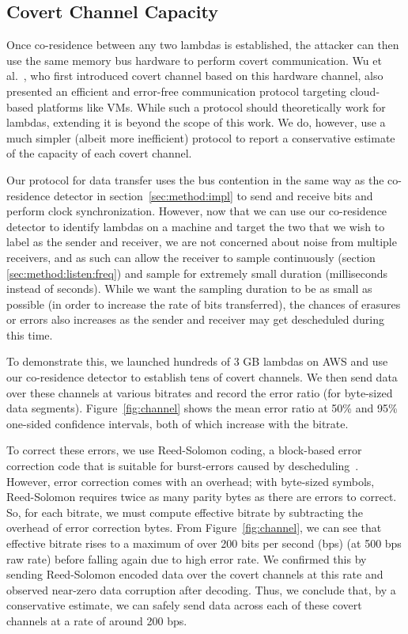 \subsection{Covert Channel Capacity}

Once co-residence between any two lambdas is established, the attacker can then
use the same memory bus hardware to perform covert communication. Wu et
al.~\cite{wuusenix2012}, who first introduced covert channel based on this
hardware channel, also presented an efficient and error-free communication
protocol targeting cloud-based platforms like VMs.  While such a protocol should
theoretically work for lambdas, extending it is beyond the scope of this work.
We do, however, use a much simpler (albeit more inefficient) protocol to report
a conservative estimate of the capacity of each covert channel.

Our protocol for data transfer uses the bus contention in the same way as the
co-residence detector in section~\ref{sec:method:impl} to send and receive bits
and perform clock synchronization. However, now that we can use our co-residence
detector to identify lambdas on a machine and target the two that we wish to
label as the sender and receiver, we are not concerned about noise from multiple
receivers, and as such can allow the receiver to sample continuously (section
\ref{sec:method:listen:freq}) and sample for extremely small duration
(milliseconds instead of seconds). While we want the sampling duration to be as
small as possible (in order to increase the rate of bits transferred), the
chances of erasures or errors also increases as the sender and receiver may get
descheduled during this time. 

To demonstrate this, we launched hundreds of 3 GB lambdas on AWS and use our
co-residence detector to establish tens of covert channels. We then send data
over these channels at various bitrates and record the error ratio (for
byte-sized data segments). Figure~\ref{fig:channel} shows the mean error ratio
at 50\% and 95\% one-sided confidence intervals, both of which increase with the bitrate.

To correct these errors, we use Reed-Solomon coding, a block-based error correction 
code that is suitable for burst-errors caused by descheduling~\cite{wuusenix2012}. 
However, error correction comes with an overhead; with byte-sized symbols,
Reed-Solomon requires twice as many parity bytes as there are errors to correct. 
So, for each bitrate, we must compute
effective bitrate by subtracting the overhead of error correction bytes.
From Figure~\ref{fig:channel}, we can see that effective bitrate rises to a
maximum of over 200 bits per second (bps) (at 500 bps raw rate) before falling
again due to high error rate. We confirmed this by sending Reed-Solomon encoded
data over the covert channels at this rate and observed near-zero data
corruption after decoding. Thus, we conclude that, by a conservative estimate, 
we can safely send data across each of these covert channels at a rate of around 200 bps.



